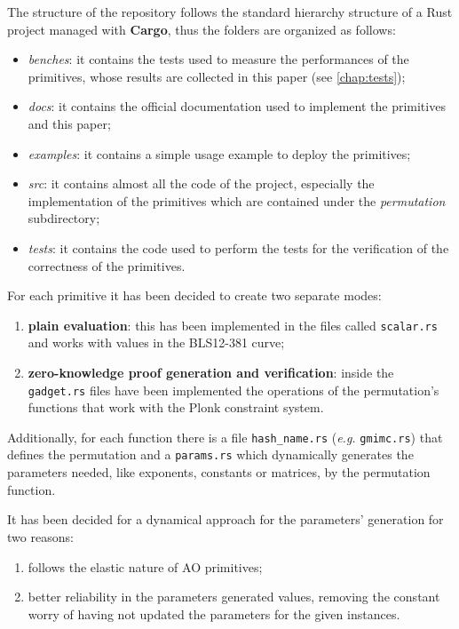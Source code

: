 \documentclass[12pt, a4paper]{report}
\begin{document}
The structure of the repository follows the standard hierarchy structure of a Rust project managed with \textbf{Cargo}, thus the folders are organized as follows:
\begin{itemize}
  \item \textit{benches}: it contains the tests used to measure the performances of the primitives, whose results are collected in this paper (see \autoref{chap:tests});
  \item \textit{docs}: it contains the official documentation used to implement the primitives and this paper;
  \item \textit{examples}: it contains a simple usage example to deploy the primitives;
  \item \textit{src}: it contains almost all the code of the project, especially the implementation of the primitives which are contained under the \textit{permutation} subdirectory;
  \item \textit{tests}: it contains the code used to perform the tests for the verification of the correctness of the primitives.
\end{itemize}

For each primitive it has been decided to create two separate modes:
\begin{enumerate}
  \item \textbf{plain evaluation}: this has been implemented in the files called \texttt{scalar.rs} and works with values in the BLS12-381 curve;
  \item \textbf{zero-knowledge proof generation and verification}: inside the \texttt{gadget.rs} files have been implemented the operations of the permutation's functions that work with the \textsf{Plonk} constraint system.
\end{enumerate}
Additionally, for each function there is a file \texttt{hash\_name.rs} (\textsl{e.g.} \texttt{gmimc.rs}) that defines the permutation and a \texttt{params.rs} which dynamically generates the parameters needed, like exponents, constants or matrices, by the permutation function.

It has been decided for a dynamical approach for the parameters' generation for two reasons:
\begin{enumerate}
  \item follows the elastic nature of AO primitives;
  \item better reliability in the parameters generated values, removing the constant worry of having not updated the parameters for the given instances.
\end{enumerate}
\end{document}
